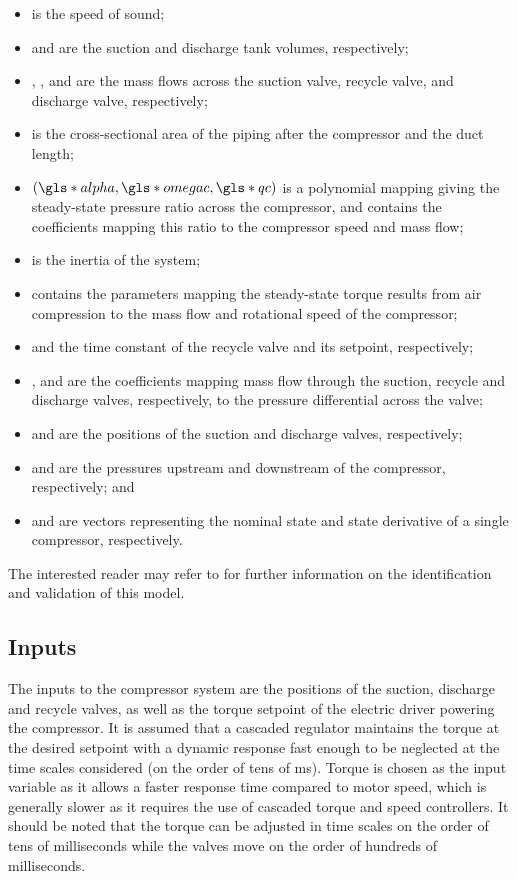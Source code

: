 \begin{itemize}[noitemsep]
  \item {} is the speed of sound;
  \item {} and  are the suction and discharge tank volumes, respectively;
  \item {}, , and  are the mass flows across the suction valve, recycle valve, and discharge valve, respectively;
  \item {} is the cross-sectional area of the piping after the compressor and  the duct length;
  \item {}$\left(\g{alpha},\g{omegac}, \g{qc} \right)$ is a polynomial mapping giving the steady-state pressure ratio across the compressor, and  contains the coefficients mapping this ratio to the compressor speed and mass flow;
  \item {} is the inertia of the system;
  \item {} contains the parameters mapping the steady-state torque results from air compression to the mass flow and rotational speed of the compressor;
  \item {} and  the time constant of the recycle valve and its setpoint, respectively;
  \item {},  and  are the coefficients mapping mass flow through the suction, recycle and discharge valves, respectively, to the pressure differential across the valve;
  \item {} and  are the positions of the suction and discharge valves, respectively;
  \item {} and  are the pressures upstream and downstream of the compressor, respectively; and
  \item {} and  are vectors representing the nominal state and state derivative of a single compressor, respectively.
\end{itemize}

The interested reader may refer to \cite{Cortinovis2015} for further information on the identification and validation of this model.

\subsection{Inputs}

The inputs to the compressor system are the positions of the suction, discharge and recycle valves, as well as the torque setpoint of the electric driver powering the compressor.
It is assumed that a cascaded regulator maintains the torque at the desired setpoint with a dynamic response fast enough to be neglected at the time scales considered (on the order of tens of ms).
Torque is chosen as the input variable as it allows a faster response time compared to motor speed, which is generally slower as it requires the use of cascaded torque and speed controllers.
It should be noted that the torque can be adjusted in time scales on the order of tens of milliseconds while the valves move on the order of hundreds of milliseconds.

